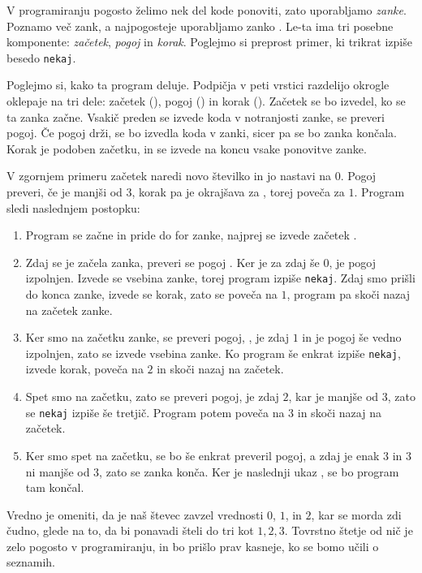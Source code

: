 
V programiranju pogosto želimo nek del kode ponoviti, zato uporabljamo
\emph{zanke}.
Poznamo več zank, a najpogosteje uporabljamo zanko .
Le-ta ima tri posebne komponente: \emph{začetek}, \emph{pogoj} in \emph{korak}.
Poglejmo si preprost primer, ki trikrat izpiše besedo \texttt{nekaj}.


Poglejmo si, kako ta program deluje. Podpičja v peti vrstici razdelijo okrogle
oklepaje na tri dele: začetek (), pogoj ()
in korak ().
Začetek se bo izvedel, ko se ta zanka začne.
Vsakič preden se izvede koda v notranjosti zanke, se preveri pogoj.
Če pogoj drži, se bo izvedla koda v zanki, sicer pa se bo zanka končala.
Korak je podoben začetku, in se izvede na koncu vsake ponovitve zanke.

V zgornjem primeru začetek naredi novo številko  in jo nastavi na
$0$.
Pogoj preveri, če je  manjši od $3$, korak  pa je
okrajšava za , torej poveča  za $1$.
Program sledi naslednjem postopku:
\begin{enumerate}
	\item Program se začne in pride do for zanke,
	  najprej se izvede začetek .
	\item Zdaj se je začela zanka, preveri se pogoj .
	  Ker je  za zdaj še $0$, je pogoj izpolnjen.
	  Izvede se vsebina zanke, torej program izpiše \texttt{nekaj}.
	  Zdaj smo prišli do konca zanke, izvede se korak, zato se 
	  poveča na $1$, program pa skoči nazaj na začetek zanke.
	\item Ker smo na začetku zanke, se preveri pogoj, ,
	   je zdaj $1$ in je pogoj še vedno izpolnjen, zato se izvede
	  vsebina zanke.
	  Ko program še enkrat izpiše \texttt{nekaj}, izvede korak, 
	  poveča na $2$ in skoči nazaj na začetek.
	\item Spet smo na začetku, zato se preveri pogoj,  je zdaj $2$,
	  kar je manjše od $3$, zato se \texttt{nekaj} izpiše še tretjič.
	  Program potem poveča  na $3$ in skoči nazaj na začetek.
	\item Ker smo spet na začetku, se bo še enkrat preveril pogoj,
	  a zdaj je  enak $3$ in $3$ ni manjše od $3$,
	  zato se zanka konča.
	  Ker je naslednji ukaz , se bo program tam končal.
\end{enumerate}
%
Vredno je omeniti, da je naš števec zavzel vrednosti $0$, $1$, in $2$, kar se
morda zdi čudno, glede na to, da bi ponavadi šteli do tri kot $1,2,3$.
Tovrstno štetje od nič je zelo pogosto v programiranju, in bo prišlo prav
kasneje, ko se bomo učili o seznamih.

